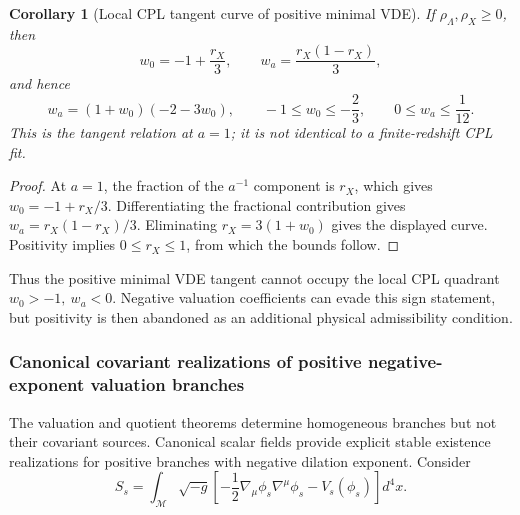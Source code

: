 \documentclass[11pt,a4paper]{article}
\def\dd{d}%
\numberwithin{equation}{section}
\theoremstyle{definition}
\theoremstyle{plain}
\newtheorem{corollary}[criterion]{Corollary}
\theoremstyle{remark}
\newcommand{\M}{\mathcal{M}}
\newcommand{\dd}{\mathrm{d}}
\begin{document}
\begin{corollary}[Local CPL tangent curve of positive minimal VDE]
If \(\rho_\Lambda,\rho_X\ge0\), then
\begin{equation}
w_0=-1+\frac{r_X}{3},
\qquad
w_a=\frac{r_X(1-r_X)}{3},
\end{equation}
and hence
\begin{equation}
\boxed{
w_a=(1+w_0)(-2-3w_0),
\qquad
-1\le w_0\le-\frac23,
\qquad
0\le w_a\le\frac1{12}.
}
\end{equation}
This is the tangent relation at \(a=1\); it is not identical to a finite-redshift CPL fit.
\end{corollary}
\begin{proof}
At \(a=1\), the fraction of the \(a^{-1}\) component is \(r_X\), which gives \(w_0=-1+r_X/3\). Differentiating the fractional contribution gives \(w_a=r_X(1-r_X)/3\). Eliminating \(r_X=3(1+w_0)\) gives the displayed curve. Positivity implies \(0\le r_X\le1\), from which the bounds follow.
\end{proof}

Thus the positive minimal VDE tangent cannot occupy the local CPL quadrant \(w_0>-1,\ w_a<0\). Negative valuation coefficients can evade this sign statement, but positivity is then abandoned as an additional physical admissibility condition.

\subsubsection{Canonical covariant realizations of positive negative-exponent valuation branches}
The valuation and quotient theorems determine homogeneous branches but not their covariant sources. Canonical scalar fields provide explicit stable existence realizations for positive branches with negative dilation exponent. Consider
\begin{equation}
S_s=\int_{\M}\sqrt{-g}\left[
-\frac12\nabla_\mu\phi_s\nabla^\mu\phi_s-V_s(\phi_s)
\right]\dd^4x.
\end{equation}
\end{document}

